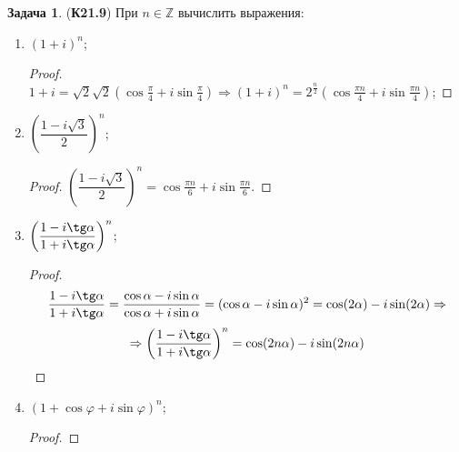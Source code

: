\documentclass[12pt]{article}
\newcommand{\MZ}{\mathbb{Z}}
\theoremstyle{definition}
\newtheorem{problem}{Задача}
\begin{document}
\begin{problem}(\textbf{К21.9}) При $n \in \MZ$ вычислить выражения:
	\begin{enumerate}[label=\asbuk*)]
		\item $(1 + i)^n$;
		\begin{proof}
			$1 +i = \sqrt{2}\sqrt{2}\left(\cos\tfrac{\pi}{4} + i \sin\tfrac{\pi}{4}\right) \Rightarrow (1 + i)^n = 2^{\tfrac{n}{2}}\left(\cos\tfrac{\pi n}{4} + i \sin \tfrac{\pi n}{4}\right)$;
		\end{proof}
		\item $\left(\dfrac{1 -i\sqrt{3}}{2}\right)^n$;
		\begin{proof}
			$\left(\dfrac{1 -i\sqrt{3}}{2}\right)^n = \cos\tfrac{\pi n}{6} + i \sin\tfrac{\pi n}{6}$.
		\end{proof}
		\item $\left(\dfrac{1 - i \tg\alpha}{1 + i\tg\alpha}\right)^n$;
		\begin{proof}
			$$
				\dfrac{1 - i \tg\alpha}{1 + i\tg\alpha} = \dfrac{\cos\alpha - i\sin\alpha}{\cos\alpha + i \sin\alpha} = (\cos\alpha - i\sin\alpha)^2 = \cos(2\alpha) - i\sin(2\alpha) \Rightarrow
			$$
			$$
				\Rightarrow \left(\dfrac{1 - i \tg\alpha}{1 + i\tg\alpha}\right)^n = \cos(2n\alpha) - i\sin(2n\alpha) 
			$$
		\end{proof}
		\item $(1 + \cos{\varphi} + i\sin\varphi)^n$;
		\begin{proof}
			
		\end{proof}
	\end{enumerate}
\end{problem}
\end{document}
